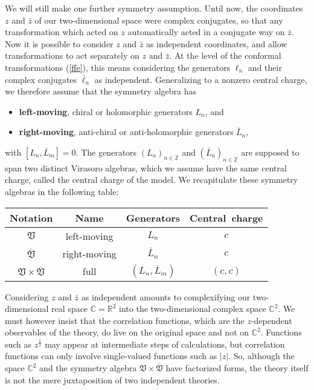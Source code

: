 \documentclass[12pt,a4paper,notitlepage]{report}
\newcommand \Z {\mathbb{Z}}
\newcommand \R {\mathbb{R}}
\newcommand \C {\mathbb{C}}
\numberwithin{equation}{section}
\theoremstyle{break}
\begin{document}
We will still make one further symmetry assumption. Until now, the coordinates $z$ and $\bar{z}$ of our two-dimensional space were complex conjugates, so that any transformation which acted on $z$ automatically acted in a conjugate way on $\bar{z}$. Now it is possible to consider $z$ and $\bar{z}$ as independent coordinates, and allow transformations to act separately on $z$ and $\bar{z}$. At the level of the conformal transformations (\ref{ffe}), this means considering the generators $\ell_n$ and their complex conjugates $\bar{\ell}_n$ as independent. Generalizing to a nonzero central charge, we therefore assume that the symmetry algebra has 
\begin{itemize}
 \item \textbf{\boldmath left-moving}, chiral or holomorphic
generators $L_n$,  and
\item  \textbf{\boldmath right-moving}, anti-chiral or anti-holomorphic generators $\bar{L}_n$,
\end{itemize}
 with
$[L_n,\bar{L}_m]=0$. The generators $(L_n)_{n\in\Z}$ and $(\bar{L}_n)_{n\in\Z}$ are supposed to span two distinct Virasoro algebras, which we assume have the same central charge, called the central charge of the model. 
We recapitulate these symmetry algebras in the following table:
\begin{center}
\renewcommand{\arraystretch}{1.3}
 \begin{tabular}{|c|c|c|c|}
 \hline
Notation &  Name & Generators &  Central\ charge
\\
\hline\hline
 $\mathfrak{V}$ & left-moving & $L_n$ & $c$
\\
\hline
$\overline{\mathfrak{V}}$ & right-moving & $\bar{L}_n$ & $c$
\\
\hline
$\mathfrak{V}\times \overline{\mathfrak{V}}$ & full & $(L_n,\bar{L}_m)$ & $(c,c)$
\\  
\hline
 \end{tabular}
\end{center}
Considering $z$ and $\bar{z}$ as independent amounts to complexifying our two-dimensional real space $\C=\R^2$ into the two-dimensional complex space $\C^2$. We must however insist that the correlation functions, which are the $z$-dependent observables of the theory, do live on the original space and not on $\C^2$. Functions such as $z^\frac12$ may appear at intermediate steps of calculations, but correlation functions can only involve single-valued functions such as $|z|$. So, although the space $\C^2$ and the symmetry algebra $\mathfrak{V}\times \overline{\mathfrak{V}}$  have factorized forms, the theory itself is not the mere juxtaposition of two independent theories. 
\end{document}

